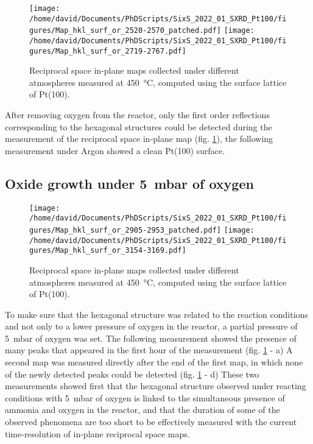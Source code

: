 \begin{figure}[!htb]
    \centering
    \texttt{[image: /home/david/Documents/PhDScripts/SixS\_2022\_01\_SXRD\_Pt100/figures/Map\_hkl\_surf\_or\_2520-2570\_patched.pdf]}
    \texttt{[image: /home/david/Documents/PhDScripts/SixS\_2022\_01\_SXRD\_Pt100/figures/Map\_hkl\_surf\_or\_2719-2767.pdf]}
    \caption{
        Reciprocal space in-plane maps collected under different atmospheres measured at \qty{450}{\degreeCelsius}, computed using the surface lattice of Pt(100).
    }
    \label{fig:MapsPt100C}
\end{figure}

After removing oxygen from the reactor, only the first order reflections corresponding to the hexagonal structures could be detected during the measurement of the reciprocal space in-plane map (fig. \ref{fig:MapsPt100C}), the following measurement under Argon showed a clean Pt(100) surface.

\subsection{Oxide growth under \qty{5}{\milli\bar} of oxygen}

\begin{figure}[!htb]
    \centering
    \texttt{[image: /home/david/Documents/PhDScripts/SixS\_2022\_01\_SXRD\_Pt100/figures/Map\_hkl\_surf\_or\_2905-2953\_patched.pdf]}
    \texttt{[image: /home/david/Documents/PhDScripts/SixS\_2022\_01\_SXRD\_Pt100/figures/Map\_hkl\_surf\_or\_3154-3169.pdf]}
    \caption{
        Reciprocal space in-plane maps collected under different atmospheres measured at \qty{450}{\degreeCelsius}, computed using the surface lattice of Pt(100).
    }
    \label{fig:MapsPt100D}
\end{figure}

To make sure that the hexagonal structure was related to the reaction conditions and not only to a lower pressure of oxygen in the reactor, a partial pressure of \qty{5}{\milli\bar} of oxygen was set.
The following measurement showed the presence of many peaks that appeared in the first hour of the measurement (fig. \ref{fig:MapsPt100C} - a)
A second map was measured directly after the end of the first map, in which none of the newly detected peaks could be detected (fig. \ref{fig:MapsPt100C} - d)
These two measurements showed first that the hexagonal structure observed under reacting conditions with \qty{5}{\milli\bar} of oxygen is linked to the simultaneous presence of ammonia and oxygen in the reactor, and that the duration of some of the observed phenomena are too short to be effectively measured with the current time-resolution of in-plane reciprocal space maps.

